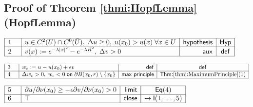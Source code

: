 \documentclass[11pt,reqno]{amsart}
\begin{document}
	\subsection*{Proof of Theorem \protect\ref{thmi:HopfLemma} (\textsf{HopfLemma})}
	\noindent$\begin{array}{|m{0.5cm}|l|r|c|}
	\hline
	1 & u\in C^{2}(U)\cap C^{0}(\bar{U}),\;\Delta u\ge0,\;u(x_{0})>u(x)\;\forall x\in U & \mathsf{hypothesis} & \mathsf{Hyp} \\ \hline
	2 & v(x):=e^{-\lambda|x|^{2}}-e^{-\lambda R^{2}},\;\Delta v>0 & \mathsf{aux} & \mathsf{def} \\ \hline
	\end{array}$
	\par\nointerlineskip\noindent$\begin{array}{|m{0.5cm}|l|r|c|}
	\hline
	3 & w_{\epsilon}:=u-u(x_{0})+\epsilon v & \mathsf{def} & \mathsf{def} \\ \hline
	4 & \Delta w_{\epsilon}>0,\;w_{\epsilon}<0\;\mathsf{on}\;\partial B(x_{0},r)\setminus\{x_{0}\} & \mathsf{max\ principle} & \textsf{Thm:}\ref{thmi:MaximumPrinciple}(1) \\ \hline
	\end{array}$
	\par\nointerlineskip\noindent$\begin{array}{|m{0.5cm}|l|r|c|}
	\hline
	5 & \partial u/\partial\nu(x_{0})\ge-\epsilon\partial v/\partial\nu(x_{0})>0 & \mathsf{limit} & \mathsf{Eq}(4) \\ \hline
	6 & \top & \mathsf{close} & \to\mathsf{I}(1,\dots,5) \\ \hline
	\end{array}$
	\medskip
	
\end{document}
